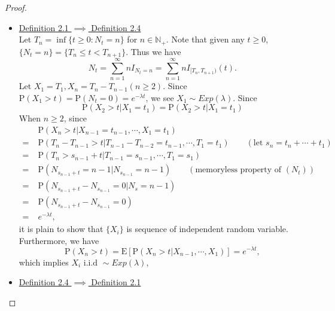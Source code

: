 \documentclass{report}
\theoremstyle{nonumberplain}
\newtheorem{proof}{Proof.}
\begin{document}
\begin{proof}
\begin{itemize}
	\item\noindent\underline{Definition 2.1 $\implies$ Definition 2.4}\\
	Let $T_n=\inf\{t\ge0:N_t= n\}$ for $n\in\mathbb{N}_+$. Note that given any $t\ge0$, $\{N_t=n\}=\{T_n\le t<T_{n+1}\}$. Thus we have
	\[
	N_t=\sum_{n=1}^{\infty}nI_{N_t=n}=\sum_{n=1}^{\infty}nI_{[T_n,T_{n+1})}(t).
	\]
	Let $X_1=T_1,X_{n}=T_{n}-T_{n-1}(n\ge2)$. Since $\mathrm{P}(X_1>t)=\mathrm{P}(N_t=0)=e^{-\lambda t}$, we see $X_1\sim Exp(\lambda)$. 
	Since
	\[
	\mathrm{P}(X_2>t|X_1=t_1)=\mathrm{P}(X_2>t|X_1=t_1)
	\]
	When $n\ge2$, since
	\begin{align*}
	&\mathrm{P}(X_n>t|X_{n-1}=t_{n-1},\cdots,X_1=t_1)\\
	=\;&\mathrm{P}(T_{n}-T_{n-1}>t|T_{n-1}-T_{n-2}=t_{n-1},\cdots,T_1=t_1)\qquad(\text{let }s_n=t_{n}+\cdots +t_1)\\
	=\;&\mathrm{P}(T_{n}>s_{n-1}+t|T_{n-1}=s_{n-1},\cdots,T_1=s_1)\\
	=\;&\mathrm{P}(N_{s_{n-1}+t}=n-1|N_{s_{n-1}}=n-1)\qquad(\text{memoryless property of }(N_t))\\
	=\;&\mathrm{P}(N_{s_{n-1}+t}-N_{s_{n-1}}=0|N_s=n-1)\\
	=\;&\mathrm{P}(N_{s_{n-1}+t}-N_{s_{n-1}}=0)\\
	=\;&e^{-\lambda t},
	\end{align*}
	it is plain to show that $\{X_i\}$ is sequence of independent random variable. Furthermore, we have $$\mathrm{P}(X_n>t)=\mathrm{E}[\mathrm{P}(X_n>t|X_{n-1},\cdots,X_1)]=e^{-\lambda t},$$
	which implies $X_i\text{ i.i.d }\sim Exp(\lambda)$,
	\item\noindent\underline{Definition 2.4 $\implies$ Definition 2.1}
	

\end{itemize}
\end{proof}
\end{document}

